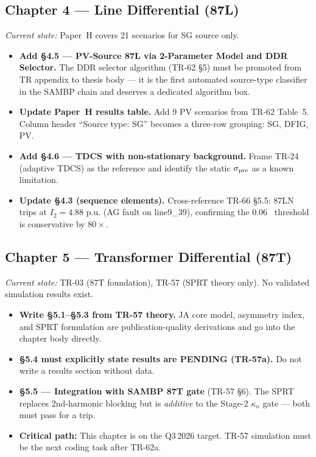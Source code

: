\documentclass[12pt,a4paper]{article}
\newcommand{\kn}{\kappa_n}
\newcommand{\pu}{\,\text{p.u.}}
\begin{document}
\subsection{Chapter 4 — Line Differential (87L)}

\textit{Current state:} Paper~H covers 21 scenarios for SG source only.

\begin{itemize}
  \item \textbf{Add §4.5 — PV-Source 87L via 2-Parameter Model and DDR Selector.}
    The DDR selector algorithm (TR-62 §5) must be promoted from TR appendix to
    thesis body — it is the first automated source-type classifier in the SAMBP
    chain and deserves a dedicated algorithm box.
  \item \textbf{Update Paper~H results table.}
    Add 9 PV scenarios from TR-62 Table~5.
    Column header ``Source type: SG'' becomes a three-row grouping: SG, DFIG, PV.
  \item \textbf{Add §4.6 — TDCS with non-stationary background.}
    Frame TR-24 (adaptive TDCS) as the reference and identify the static $\sigma_{\rm pre}$
    as a known limitation.
  \item \textbf{Update §4.3 (sequence elements).}
    Cross-reference TR-66 §5.5: 87LN trips at $I_2 = 4.88\,\pu$ (AG fault on line9\_39),
    confirming the 0.06\,\pu\ threshold is conservative by $80\times$.
\end{itemize}

\subsection{Chapter 5 — Transformer Differential (87T)}

\textit{Current state:} TR-03 (87T foundation), TR-57 (SPRT theory only).
No validated simulation results exist.

\begin{itemize}
  \item \textbf{Write §5.1--§5.3 from TR-57 theory.}
    JA core model, asymmetry index, and SPRT formulation are publication-quality
    derivations and go into the chapter body directly.
  \item \textbf{§5.4 must explicitly state results are PENDING (TR-57a).}
    Do not write a results section without data.
  \item \textbf{§5.5 — Integration with SAMBP 87T gate} (TR-57 §6).
    The SPRT replaces 2nd-harmonic blocking but is \emph{additive} to the
    Stage-2 $\kn$ gate — both must pass for a trip.
  \item \textbf{Critical path:} This chapter is on the Q3\,2026 target.
    TR-57 simulation must be the next coding task after TR-62a.
\end{itemize}
\end{document}
